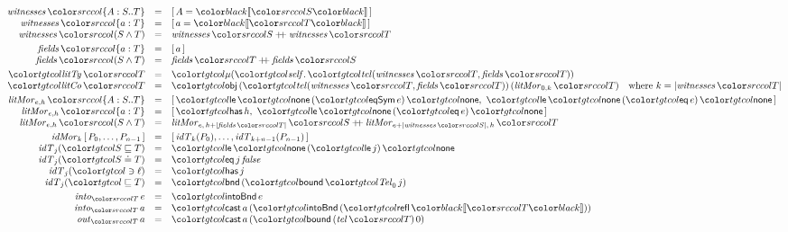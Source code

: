 \begin{figure}
\small
\[
\begin{array}{@{}rcl@{}}
\mathit{witnesses}\,\dtyp{A}{S}{T} & = & [\,A = \trans{S}\,] \\
\mathit{witnesses}\,\dfld{a}{T} & = & [\,a = \trans{T}\,] \\
\mathit{witnesses}\,\src{(S \wedge T)} & = & \mathit{witnesses}\,\src{S} \mathbin{+\!\!+} \mathit{witnesses}\,\src{T} \\[3pt]
\mathit{fields}\,\dfld{a}{T} & = & [\,a\,] \\
\mathit{fields}\,\src{(S \wedge T)} & = & \mathit{fields}\,\src{T} \mathbin{+\!\!+} \mathit{fields}\,\src{S} \\[3pt]
\tgt{\mathit{litTy}}\,\src{T} & = & \obj{\ofLit{\mathit{witnesses}\,\src{T}}{\mathit{fields}\,\src{T}}} \\
\tgt{\mathit{litCo}}\,\src{T} & = & \ev{obj}\,(\ofLit{\mathit{witnesses}\,\src{T}}{\mathit{fields}\,\src{T}})\,(\mathit{litMor}_{0,k}\,\src{T}) \quad \text{where } k = |\mathit{witnesses}\,\src{T}| \\[3pt]
\mathit{litMor}_{e,h}\,\dtyp{A}{S}{T} & = & [\,\ev{le}\,\ev{none}\,(\ev{eqSym}\,e)\,\ev{none},\ \ev{le}\,\ev{none}\,(\ev{eq}\,e)\,\ev{none}\,] \\
\mathit{litMor}_{e,h}\,\dfld{a}{T} & = & [\,\ev{has}\,h,\ \ev{le}\,\ev{none}\,(\ev{eq}\,e)\,\ev{none}\,] \\
\mathit{litMor}_{e,h}\,\src{(S \wedge T)} & = & \mathit{litMor}_{e,\,h + |\mathit{fields}\,\src{T}|}\,\src{S} \mathbin{+\!\!+} \mathit{litMor}_{e + |\mathit{witnesses}\,\src{S}|,\,h}\,\src{T} \\[3pt]
\mathit{idMor}_k\,[\,P_0, \ldots, P_{n-1}\,] & = & [\,\mathit{idT}_{k}(P_0), \ldots, \mathit{idT}_{k+n-1}(P_{n-1})\,] \\
\mathit{idT}_j(\ple{S}{T}) & = & \ev{le}\,\ev{none}\,(\ev{le}\,j)\,\ev{none} \\
\mathit{idT}_j(\peq{S}{T}) & = & \ev{eq}\,j\,\mathit{false} \\
\mathit{idT}_j(\phas{\ell}) & = & \ev{has}\,j \\
\mathit{idT}_j(\pbnd{T}) & = & \ev{bnd}\,(\ev{bound}\,\tel_0\,j) \\[3pt]
\mathit{into}_{\src{T}}\,e & = & \ev{intoBnd}\,e \\
\mathit{into}_{\src{T}}\,a & = & \ev{cast}\,a\,(\ev{intoBnd}\,(\ev{refl}\,\trans{T})) \\
\mathit{out}_{\src{T}}\,a & = & \ev{cast}\,a\,(\ev{bound}\,(\mathit{tel}\,\src{T})\,0) \\[3pt]

\end{array}\]
\end{figure}
